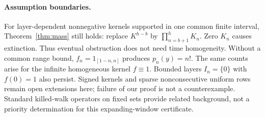 \paragraph{Assumption boundaries.}
For layer-dependent nonnegative kernels supported in one common finite interval, Theorem~\ref{thm:mass} still holds: replace $K^{h-b}$ by $\prod_{n=b+1}^h K_n$. Zero $K_n$ causes extinction. Thus eventual obstruction does not need time homogeneity. Without a common range bound, $f_n=1_{[1-n,n]}$ produces $p_n(y)=n!$. The same counts arise for the infinite homogeneous kernel $f\equiv1$. Bounded layers $I_n=\{0\}$ with $f(0)=1$ also persist. Signed kernels and sparse nonconsecutive uniform rows remain open extensions here; failure of our proof is not a counterexample. Standard killed-walk operators on fixed sets \cite[Section 12.4.1]{LawlerLimic} provide related background, not a priority determination for this expanding-window certificate.
